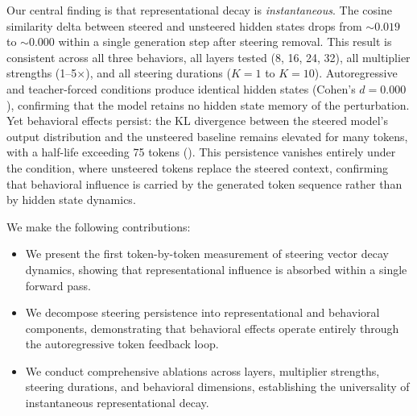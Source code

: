 Our central finding is that representational decay is \emph{instantaneous}.
The cosine similarity delta between steered and unsteered hidden states drops
from ${\sim}0.019$ to ${\sim}0.000$ within a single generation step after
steering removal. This result is consistent across all three behaviors, all
layers tested (8, 16, 24, 32), all multiplier strengths (1--5$\times$), and
all steering durations ($K{=}1$ to $K{=}10$). Autoregressive and teacher-forced
conditions produce identical hidden states (Cohen's $d = 0.000$), confirming
that the model retains no hidden state memory of the perturbation. Yet
behavioral effects persist: the KL divergence between the steered model's
output distribution and the unsteered baseline remains elevated for many tokens,
with a half-life exceeding 75 tokens (). This persistence vanishes entirely under
the \TFclean condition, where unsteered tokens replace the steered context,
confirming that behavioral influence is carried by the generated token sequence
rather than by hidden state dynamics.

We make the following contributions:
\begin{itemize}[leftmargin=*,itemsep=0pt,topsep=0pt]
    \item We present the first token-by-token measurement of steering vector
    decay dynamics, showing that representational influence is absorbed within
    a single forward pass.
    \item We decompose steering persistence into representational and behavioral
    components, demonstrating that behavioral effects operate entirely through
    the autoregressive token feedback loop.
    \item We conduct comprehensive ablations across layers, multiplier strengths,
    steering durations, and behavioral dimensions, establishing the universality
    of instantaneous representational decay.
\end{itemize}
